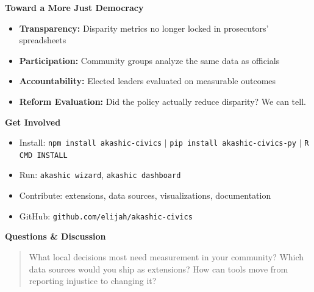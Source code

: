 \documentclass[11pt]{article}
\newcommand{\slide}[1]{\vspace{0.4em}\noindent\textbf{#1}\vspace{0.2em}}
\begin{document}
\slide{Toward a More Just Democracy}

\begin{itemize}
    \item \textbf{Transparency:} Disparity metrics no longer locked in prosecutors' spreadsheets
    \item \textbf{Participation:} Community groups analyze the same data as officials
    \item \textbf{Accountability:} Elected leaders evaluated on measurable outcomes
    \item \textbf{Reform Evaluation:} Did the policy actually reduce disparity?  We can tell.
\end{itemize}

\slide{Get Involved}

\begin{itemize}
    \item Install: \texttt{npm install akashic-civics} $\vert$ \texttt{pip install akashic-civics-py} $\vert$ \texttt{R CMD INSTALL}
    \item Run: \texttt{akashic wizard}, \texttt{akashic dashboard}
    \item Contribute: extensions, data sources, visualizations, documentation
    \item GitHub: \texttt{github.com/elijah/akashic-civics}
\end{itemize}

\slide{Questions \& Discussion}

\begin{quote}
What local decisions most need measurement in your community? Which data sources would you ship as extensions?  How can tools move from reporting injustice to changing it?
\end{quote}
\end{document}
